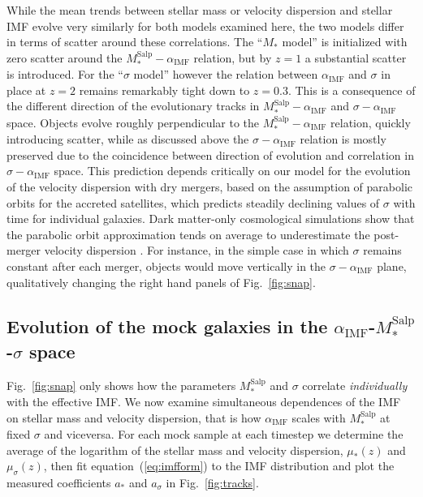 \documentclass[usenatbib]{mnras}
\def\msalp{M_*^{\mathrm{Salp}}}
\def\aimf{\alpha_{\mathrm{IMF}}}
\def\Fref#1{Fig.~\ref{#1}\xspace}
\def\Eref#1{equation~(\ref{#1})\xspace}
\begin{document}
While the mean trends between stellar mass or velocity dispersion and
stellar IMF evolve very similarly for both models examined here, the
two models differ in terms of scatter around these correlations.  The
``$M_*$ model'' is initialized with zero scatter around the
$\msalp-\aimf$ relation, but by $z=1$ a substantial scatter is
introduced.  For the ``$\sigma$ model'' however the relation between
$\aimf$ and $\sigma$ in place at $z=2$ remains remarkably tight down
to $z=0.3$.  This is a consequence of the different direction of the
evolutionary tracks in $\msalp-\aimf$ and $\sigma-\aimf$ space. Objects
evolve roughly perpendicular to the $\msalp-\aimf$ relation, quickly
introducing scatter, while as discussed above the $\sigma-\aimf$
relation is mostly preserved due to the coincidence between direction
of evolution and correlation in $\sigma-\aimf$ space.  This prediction
depends critically on our model for the evolution of the velocity
dispersion with dry mergers, based on the assumption of parabolic
orbits for the accreted satellites, which predicts steadily
  declining values of $\sigma$ with time for individual galaxies.
Dark matter-only cosmological simulations show that the parabolic
orbit approximation tends on average to underestimate the post-merger
velocity dispersion \citep{Pos++14}.  For instance, in the simple
  case in which $\sigma$ remains constant after each merger, objects
  would move vertically in the $\sigma-\aimf$ plane, qualitatively
  changing the right hand panels of \Fref{fig:snap}.



\subsection{Evolution of the mock galaxies in the $\aimf$-$\msalp$-$\sigma$ space}

\Fref{fig:snap} only shows how the parameters $\msalp$ and $\sigma$
correlate {\em individually} with the effective IMF.  We now examine
simultaneous dependences of the IMF on stellar mass and velocity
dispersion, that is how $\aimf$ scales with $\msalp$ at fixed $\sigma$
and viceversa.  For each mock sample at each timestep we determine the
average of the logarithm of the stellar mass and velocity dispersion,
$\mu_*(z)$ and $\mu_\sigma(z)$, then fit \Eref{eq:imfform} to the IMF
distribution and plot the measured coefficients $a_*$ and $a_\sigma$
in \Fref{fig:tracks}.
\end{document}

